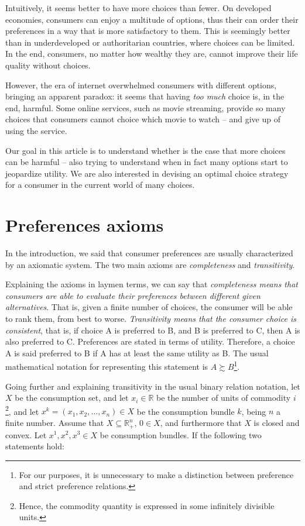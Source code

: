 \documentclass[12pt, letterpaper]{article}
\begin{document}
	Intuitively, it seems better to have more choices than fewer. On developed economies, consumers can enjoy a multitude of options, thus their can order their preferences in a way that is more satisfactory to them. This is seemingly better than in underdeveloped or authoritarian countries, where choices can be limited. In the end, consumers, no matter how wealthy they are, cannot improve their life quality without choices. 
	
	However, the era of internet overwhelmed consumers with different options, bringing an apparent paradox: it seems that having \textit{too much} choice is, in the end, harmful. Some online services, such as movie streaming, provide so many choices that consumers cannot choice which movie to watch -- and give up of using the service.
	
	Our goal in this article is to understand whether is the case that more choices can be harmful -- also trying to understand when in fact many options start to jeopardize utility. We are also interested in devising an optimal choice strategy for a consumer in the current world of many choices. 


	\section{Preferences axioms}
	In the introduction, we said that consumer preferences are usually characterized by an axiomatic system. The two main axioms are \textit{completeness} and \textit{transitivity}.  
	
	Explaining the axioms in laymen terms, we can say that \textit{completeness means that consumers are able to evaluate their preferences between different given alternatives}. That is, given a finite number of choices, the consumer will be able to rank them, from best to worse. \textit{Transitivity means that the consumer choice is consistent}, that is, if choice A is preferred to B, and B is preferred to C, then A is also preferred to C. Preferences are stated in terms of utility. Therefore, a choice A is said preferred to B if A has at least the same utility as B. The usual mathematical notation for representing this statement is $A \succsim B$\footnote{For our purposes, it is unnecessary to make a distinction between preference and strict preference relations.}.

	Going further and explaining transitivity in the usual binary relation notation, let $X$ be the consumption set, and let $x_i \in \mathbb{R}$ be the number of units of commodity $i$\footnote{Hence, the commodity quantity is expressed in some infinitely divisible units.}, and let $x^k= (x_1, x_2, \dots, x_n) \in X$ be the consumption bundle $k$, being $n$ a finite number. Assume that $X \subseteq \mathbb{R}_+^n$, $0 \in X$, and furthermore that $X$ is closed and convex. Let $x^1, x^2, x^3 \in X$ be consumption bundles. If the following two statements hold:
\end{document}
